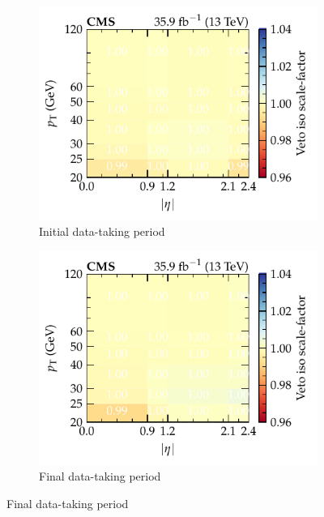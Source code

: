 \begin{figure}[htb]
    \centering
    \begin{subfigure}[b]{0.49\textwidth}
        \centering
        \includegraphics{chapters/041_corrections/images/efficiencies/objects/muons/muon_iso_loose_runbf.pdf}
        \caption{Initial data-taking period}
        \label{subfiga:muon-iso-scale-factors}
    \end{subfigure}
    \hfill
    \begin{subfigure}[b]{0.49\textwidth}
        \centering
        \includegraphics{chapters/041_corrections/images/efficiencies/objects/muons/muon_iso_loose_rungh.pdf}
        \caption{Final data-taking period}
        \label{subfigb:muon-iso-scale-factors}
    \end{subfigure}

\end{figure}
